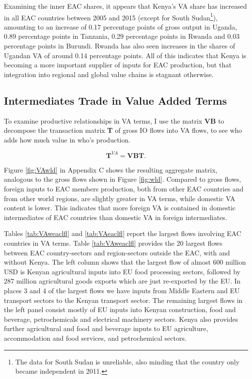 \documentclass[a4paper]{article}
\begin{document}
Examining the inner EAC shares, it appears that Kenya's VA share has increased in all EAC countries between 2005 and 2015 (except for South Sudan\footnote{The data for South Sudan is unreliable, also minding that the country only became independent in 2011.}), amounting to an increase of 0.17 percentage points of gross output in Uganda, 0.89 percentage points in Tanzania, 0.29 percentage points in Rwanda and 0.03 percentage points in Burundi. Rwanda has also seen increases in the shares of Ugandan VA of around 0.14 percentage points. All of this indicates that Kenya is becoming a more important supplier of inputs for EAC production, but that integration into regional and global value chains is stagnant otherwise. 


\subsection{Intermediates Trade in Value Added Terms}

To examine productive relationships in VA terms, I use the matrix \textbf{VB} to decompose the transaction matrix \textbf{T} of gross IO flows into VA flows, to see who adds how much value in who's production.  

\begin{equation}
\textbf{T}^{VA} = \textbf{VB} \textbf{T}.
\end{equation} 

Figure \ref{fig:VAwld} in Appendix C shows the resulting aggregate matrix, analogous to the gross flows shown in Figure \ref{fig:wld}. Compared to gross flows, foreign inputs to EAC members production, both from other EAC countries and from other world regions, are slightly greater in VA terms, while domestic VA content is lower. This indicates that more foreign VA is contained in domestic intermediates of EAC countries than domestic VA in foreign intermediates. \newline

Tables \ref{tab:VAweaclfl} and \ref{tab:VAeaclfl} report the largest flows involving EAC countries in VA terms. Table \ref{tab:VAweaclfl} provides the 20 largest flows between EAC country-sectors and region-sectors outside the EAC, with and without Kenya. The left column shows that the largest flow of almost 600 million USD is Kenyan agricultural inputs into EU food processing sectors, followed by 287 million agricultural goods exports which are just re-exported by the EU. In places 3 and 4 of the largest flows we have inputs from Middle Eastern and EU transport sectors to the Kenyan transport sector. The remaining largest flows in the left panel consist mostly of EU inputs into Kenyan construction, food and beverage, petrochemicals and electrical machinery sectors. Kenya also provides further agricultural and food and beverage inputs to EU agriculture, accommodation and food services, and petrochemical sectors.
\end{document}

